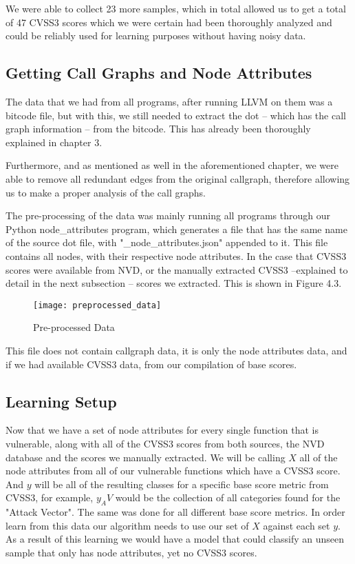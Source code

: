 We were able to collect 23 more samples, which in total allowed us to get a total of 47 CVSS3 scores which we were certain had been thoroughly analyzed and could be reliably used for learning purposes without having noisy data.

\subsection{Getting Call Graphs and Node Attributes}

The data that we had from all programs, after running LLVM on them was a bitcode file, but with this, we still needed to extract the dot -- which has the call graph information -- from the bitcode. This has already been thoroughly explained in chapter 3.

Furthermore, and as mentioned as well in the aforementioned chapter, we were able to remove all redundant edges from the original callgraph, therefore allowing us to make a proper analysis of the call graphs.

The pre-processing of the data was mainly running all programs through our Python node\_attributes program, which generates a file that has the same name of the source dot file, with "\_node\_attributes.json" appended to it. This file contains all nodes, with their respective node attributes. In the case that CVSS3 scores were available from NVD, or the manually extracted CVSS3 --explained to detail in the next subsection -- scores we extracted. This is shown in Figure  4.3.

\begin{figure}[H]
	\caption{Pre-processed Data}
	\centering
	\texttt{[image: preprocessed\_data]}
\end{figure}

This file does not contain callgraph data, it is only the node attributes data, and if we had available CVSS3 data, from our compilation of base scores.

\subsection{Learning Setup}

Now that we have a set of node attributes for every single function that is vulnerable, along with all of the CVSS3 scores from both sources, the NVD database and the scores we manually extracted. We will be calling $X$ all of the node attributes from all of our vulnerable functions which have a CVSS3 score. And $y$ will be all of the resulting classes for a specific base score metric from CVSS3, for example, $y_AV$ would be the collection of all categories found for the "Attack Vector". The same was done for all different base score metrics. In order learn from this data our algorithm needs to use our set of $X$ against each set $y$. As a result of this learning we would have a model that could classify an unseen sample that only has node attributes, yet no CVSS3 scores.

